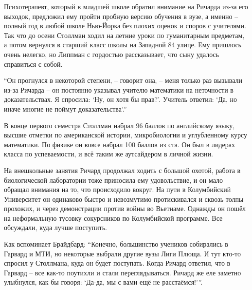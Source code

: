 Психотерапевт, который в младшей школе обратил внимание на Ричарда из-за его выходок, предложил ему пройти пробную версию обучения в вузе, а именно -- полный год в любой школе Нью-Йорка без плохих оценок и споров с учителями. Так что до осени Столлман ходил на летние уроки по гуманитарным предметам, а потом вернулся в старший класс школы на Западной 84 улице. Ему пришлось очень нелегко, но Липпман с гордостью рассказывает, что сыну удалось справиться с собой.

\enquote{Он прогнулся в некоторой степени, -- говорит она, -- меня только раз вызывали из-за Ричарда -- он постоянно указывал учителю математики на неточности в доказательствах. Я спросила: `Ну, он хотя бы прав?'. Учитель ответил: `Да, но иначе многие не поймут доказательства'.\hspace{0.01in}}

В конце первого семестра Столлман набрал 96 баллов по английскому языку, высшие отметки по американской истории, микробиологии и углубленному курсу математики. По физике он вовсе набрал 100 баллов из ста. Он был в лидерах класса по успеваемости, и всё таким же аутсайдером в личной жизни.

На внешкольные занятия Ричард продолжал ходить с большой охотой, работа в биологической лаборатории тоже приносила ему удовольствие, и он мало обращал внимания на то, что происходило вокруг. На пути в Колумбийский Университет он одинаково быстро и невозмутимо протискивался и сквозь толпы прохожих, и через демонстрации против войны во Вьетнаме. Однажды он пошёл на неформальную тусовку сокурсников по Колумбийской программе. Все обсуждали, куда лучше поступить.

Как вспоминает Брайдбард: \enquote{Конечно, большинство учеников собирались в Гарвард и МТИ, но некоторые выбрали другие вузы Лиги Плюща. И тут кто-то спросил у Столлмана, куда он будет поступать. Когда Ричард ответил, что в Гарвард -- все как-то поутихли и стали переглядываться. Ричард же еле заметно улыбнулся, как бы говоря: `Да-да, мы с вами ещё не расстаёмся!'\hspace{0.01in}}.

\theendnotes
\setcounter{endnote}{0}
